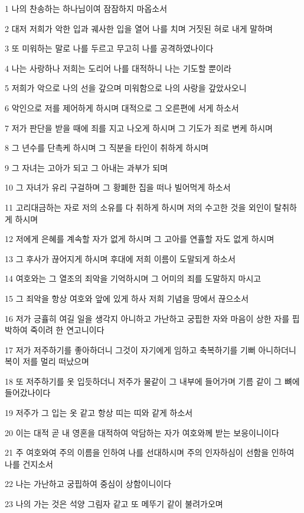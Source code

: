 \par 1 나의 찬송하는 하나님이여 잠잠하지 마옵소서
\par 2 대저 저희가 악한 입과 궤사한 입을 열어 나를 치며 거짓된 혀로 내게 말하며
\par 3 또 미워하는 말로 나를 두르고 무고히 나를 공격하였나이다
\par 4 나는 사랑하나 저희는 도리어 나를 대적하니 나는 기도할 뿐이라
\par 5 저희가 악으로 나의 선을 갚으며 미워함으로 나의 사랑을 갚았사오니
\par 6 악인으로 저를 제어하게 하시며 대적으로 그 오른편에 서게 하소서
\par 7 저가 판단을 받을 때에 죄를 지고 나오게 하시며 그 기도가 죄로 변케 하시며
\par 8 그 년수를 단촉케 하시며 그 직분을 타인이 취하게 하시며
\par 9 그 자녀는 고아가 되고 그 아내는 과부가 되며
\par 10 그 자녀가 유리 구걸하며 그 황폐한 집을 떠나 빌어먹게 하소서
\par 11 고리대금하는 자로 저의 소유를 다 취하게 하시며 저의 수고한 것을 외인이 탈취하게 하시며
\par 12 저에게 은혜를 계속할 자가 없게 하시며 그 고아를 연휼할 자도 없게 하시며
\par 13 그 후사가 끊어지게 하시며 후대에 저희 이름이 도말되게 하소서
\par 14 여호와는 그 열조의 죄악을 기억하시며 그 어미의 죄를 도말하지 마시고
\par 15 그 죄악을 항상 여호와 앞에 있게 하사 저희 기념을 땅에서 끊으소서
\par 16 저가 긍휼히 여길 일을 생각지 아니하고 가난하고 궁핍한 자와 마음이 상한 자를 핍박하여 죽이려 한 연고니이다
\par 17 저가 저주하기를 좋아하더니 그것이 자기에게 임하고 축복하기를 기뻐 아니하더니 복이 저를 멀리 떠났으며
\par 18 또 저주하기를 옷 입듯하더니 저주가 물같이 그 내부에 들어가며 기름 같이 그 뼈에 들어갔나이다
\par 19 저주가 그 입는 옷 같고 항상 띠는 띠와 같게 하소서
\par 20 이는 대적 곧 내 영혼을 대적하여 악담하는 자가 여호와께 받는 보응이니이다
\par 21 주 여호와여 주의 이름을 인하여 나를 선대하시며 주의 인자하심이 선함을 인하여 나를 건지소서
\par 22 나는 가난하고 궁핍하여 중심이 상함이니이다
\par 23 나의 가는 것은 석양 그림자 같고 또 메뚜기 같이 불려가오며
